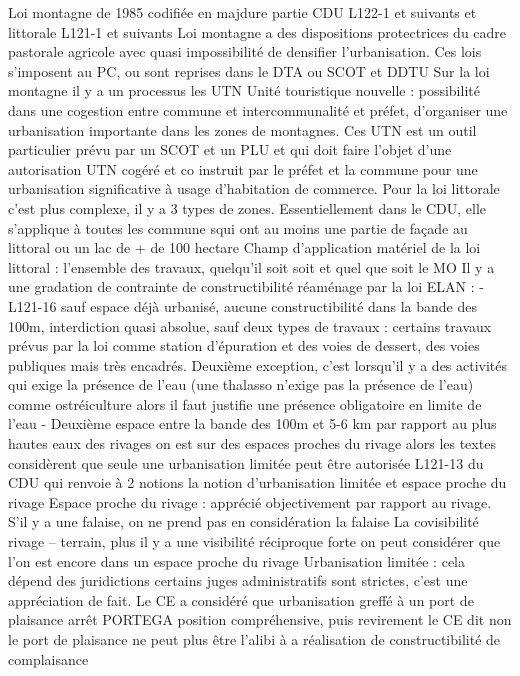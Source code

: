	Loi montagne de 1985 codifiée en majdure partie CDU L122-1 et suivants et littorale L121-1 et suivants
	Loi montagne a des dispositions protectrices du cadre pastorale agricole avec quasi impossibilité de densifier l’urbanisation.
	Ces lois s’imposent au PC, ou sont reprises dans le DTA ou SCOT et DDTU
	Sur la loi montagne il y a un processus les UTN Unité touristique nouvelle : possibilité dans une cogestion entre commune et intercommunalité et préfet, d’organiser une urbanisation importante dans les zones de montagnes.
	Ces UTN est un outil particulier prévu par un SCOT et un PLU et qui doit faire l’objet d’une autorisation UTN cogéré et co instruit par le préfet et la commune pour une urbanisation significative à usage d’habitation de commerce.
	Pour la loi littorale c’est plus complexe, il y a 3 types de zones. Essentiellement dans le CDU, elle s’applique à toutes les commune squi ont au moins une partie de façade au littoral ou un lac de + de 100 hectare
	Champ d’application matériel de la loi littoral : l’ensemble des travaux, quelqu’il soit soit et quel que soit le MO
	Il y a une gradation de contrainte de constructibilité réaménage par la loi ELAN :
	-	L121-16 sauf espace déjà urbanisé, aucune constructibilité dans la bande des 100m, interdiction quasi absolue, sauf deux types de travaux : certains travaux prévus par la loi comme station d’épuration et des voies de dessert, des voies publiques mais très encadrés. Deuxième exception, c’est lorsqu’il y a des activités qui exige la présence de l’eau (une thalasso n’exige pas la présence de l’eau) comme ostréiculture alors il faut justifie une présence obligatoire en limite de l’eau
	-	Deuxième espace entre la bande des 100m et 5-6 km par rapport au plus hautes eaux des rivages on est sur des espaces proches du rivage alors les textes considèrent que seule une urbanisation limitée peut être autorisée L121-13 du CDU qui renvoie à 2 notions la notion d’urbanisation limitée et espace proche du rivage
	Espace proche du rivage : apprécié objectivement par rapport au rivage. S’il y a une falaise, on ne prend pas en considération la falaise
	La covisibilité rivage – terrain, plus il y a une visibilité réciproque forte on peut considérer que l’on est encore dans un espace proche du rivage
	Urbanisation limitée : cela dépend des juridictions certains juges administratifs sont strictes, c’est une appréciation de fait. Le CE a considéré que urbanisation greffé à un port de plaisance arrêt PORTEGA position compréhensive, puis revirement le CE dit non le port de plaisance ne peut plus être l’alibi à a réalisation de constructibilité de complaisance
